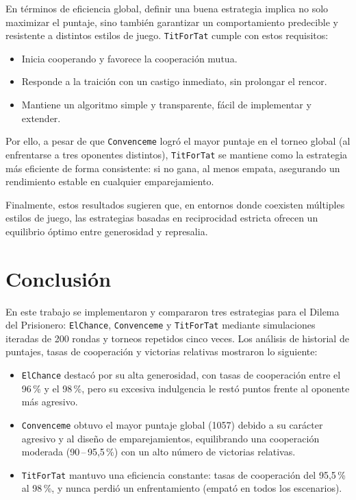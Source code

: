 \documentclass{article}
\begin{document}
En términos de eficiencia global, definir una buena estrategia implica no solo maximizar 
el puntaje, sino también garantizar un comportamiento predecible y resistente a 
distintos estilos de juego. \texttt{TitForTat} cumple con estos requisitos:  
\begin{itemize}  
  \item Inicia cooperando y favorece la cooperación mutua.  
  \item Responde a la traición con un castigo inmediato, sin prolongar el rencor.  
  \item Mantiene un algoritmo simple y transparente, fácil de implementar y extender.  
\end{itemize}  
Por ello, a pesar de que \texttt{Convenceme} logró el mayor puntaje en el torneo 
global (al enfrentarse a tres oponentes distintos), \texttt{TitForTat} se mantiene como
la estrategia más eficiente de forma consistente: si no gana, al menos empata, asegurando 
un rendimiento estable en cualquier emparejamiento.

Finalmente, estos resultados sugieren que, en entornos donde coexisten múltiples estilos 
de juego, las estrategias basadas en reciprocidad estricta ofrecen un equilibrio óptimo 
entre generosidad y represalia.

\section{Conclusión}\label{sec:conclusion}

En este trabajo se implementaron y compararon tres estrategias para el 
Dilema del Prisionero: \texttt{ElChance}, \texttt{Convenceme} y \texttt{TitForTat}
 mediante simulaciones iteradas de 200 rondas y torneos repetidos cinco veces. 
 Los análisis de historial de puntajes, tasas de cooperación y victorias
  relativas mostraron lo siguiente:

\begin{itemize}
  \item \texttt{ElChance} destacó por su alta generosidad, con tasas de 
  cooperación entre el 96\,\% y el 98\,\%, pero su excesiva indulgencia le 
  restó puntos frente al oponente más agresivo.
  \item \texttt{Convenceme} obtuvo el mayor puntaje global (1057) debido a su carácter 
  agresivo y al diseño de emparejamientos, equilibrando una cooperación moderada 
  (90\,--\,95,5\,\%) con un alto número de victorias relativas.
  \item \texttt{TitForTat} mantuvo una eficiencia constante: tasas de cooperación
   del 95,5\,\% al 98\,\%, y nunca perdió un enfrentamiento (empató en todos los escenarios).  
\end{itemize}
\end{document}
